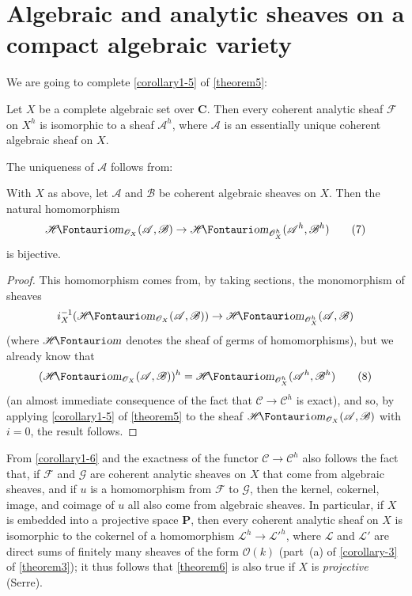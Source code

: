 \documentclass{article}
\theoremstyle{plain}
\newenvironment{theorem}[1]
  {\renewcommand\theinnercustomtheorem{#1}\innercustomtheorem}
  {\endinnercustomtheorem}
\newenvironment{corollary}[1]
  {\renewcommand\theinnercustomcorollary{#1}\innercustomcorollary}
  {\endinnercustomcorollary}
\theoremstyle{definition}
\newcommand{\sh}{\mathscr}
\newcommand{\cat}{\mathcal}
\newcommand{\shHom}{\sh{H}\textup{\kern-2.2pt{\Fontauri\slshape om}}}
\newcommand{\oldpage}[1]{\marginpar{\footnotesize$\Big\vert$ \textit{p.~#1}}}
\begin{document}
\section{Algebraic and analytic sheaves on a compact algebraic variety}
\label{section8}

We are going to complete \cref{corollary1-5} of \cref{theorem5}:

\begin{theorem}{6}
\label{theorem6}
  Let $X$ be a complete algebraic set over $\mathbf{C}$.
  Then every coherent analytic sheaf $\sh{F}$ on $X^h$ is isomorphic to a sheaf $\sh{A}^h$, where $\sh{A}$ is an essentially unique coherent algebraic sheaf on $X$.
\end{theorem}

The uniqueness of $\sh{A}$ follows from:

\begin{corollary}{1}
\label{corollary1-6}
  With $X$ as above, let $\sh{A}$ and $\sh{B}$ be coherent algebraic sheaves on $X$.
  Then the natural homomorphism
  \[
  \label{equation7}
    \shHom_{\sh{O}_X}(\sh{A},\sh{B}) \to \shHom_{\sh{O}_X^h}(\sh{A}^h,\sh{B}^h)
    \tag{7}
  \]
  is bijective.
\end{corollary}

\begin{proof}
  This homomorphism comes from, by taking sections, the monomorphism of sheaves
  \[
    i_X^{-1}(\shHom_{\sh{O}_X}(\sh{A},\sh{B})) \to \shHom_{\sh{O}_X^h}(\sh{A},\sh{B})
  \]
  (where $\shHom$ denotes the sheaf of germs of homomorphisms), but we already know that
  \[
  \label{equation8}
    (\shHom_{\sh{O}_X}(\sh{A},\sh{B}))^h = \shHom_{\sh{O}_X^h}(\sh{A}^h,\sh{B}^h)
    \tag{8}
  \]
  (an almost immediate consequence of the fact that $\cat{C}\to\cat{C}^h$ is exact), and so, by applying \cref{corollary1-5} of \cref{theorem5} to the sheaf $\shHom_{\sh{O}_X}(\sh{A},\sh{B})$ with $i=0$, the result follows.
\end{proof}

From \cref{corollary1-6} and the exactness of the functor $\cat{C}\to\cat{C}^h$ also follows the fact that, if $\sh{F}$ and $\sh{G}$ are coherent analytic sheaves on $X$ that come from algebraic sheaves, and if $u$ is a homomorphism from $\sh{F}$ to $\sh{G}$, then the kernel, cokernel, image, and coimage of $u$ all also come
\oldpage{2-15}
from algebraic sheaves.
In particular, if $X$ is embedded into a projective space $\mathbf{P}$, then every coherent analytic sheaf on $X$ is isomorphic to the cokernel of a homomorphism $\sh{L}^h\to\sh{L}'^h$, where $\sh{L}$ and $\sh{L}'$ are direct sums of finitely many sheaves of the form $\sh{O}(k)$ (part~(a) of \cref{corollary-3} of \cref{theorem3});
it thus follows that \cref{theorem6} is also true if $X$ is \emph{projective} (Serre).
\end{document}
